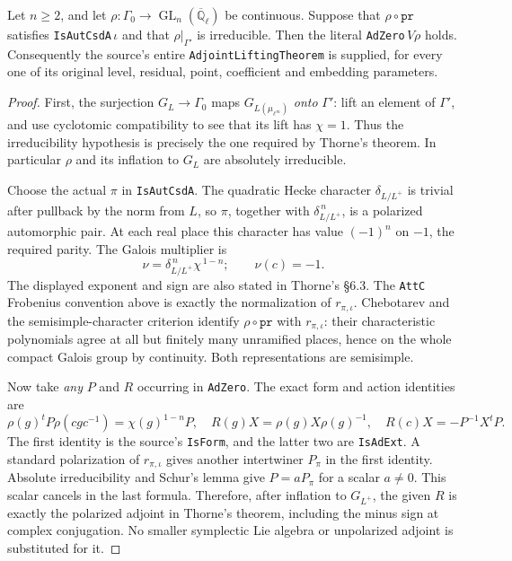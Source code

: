 \begin{proposition}
\label{claim:QX1}
Let $n\ge2$, and let $\rho:\Gamma_0\to
\operatorname{GL}_n(\overline{\mathbb Q}_\ell)$ be continuous.
Suppose that $\rho\circ\texttt{pr}$ satisfies
\texttt{IsAutCsdA}$\,\iota$ and that $\rho|_{\Gamma'}$ is
irreducible.  Then the literal \texttt{AdZero}$\,V\rho$ holds.
Consequently the source's entire \texttt{AdjointLiftingTheorem}
is supplied, for every one of its original level, residual, point,
coefficient and embedding parameters.
\end{proposition}
\begin{proof}
First, the surjection $G_L\to\Gamma_0$ maps
$G_{L(\mu_{\ell^\infty})}$ \emph{onto} $\Gamma'$: lift an element
of $\Gamma'$, and use cyclotomic compatibility to see that its lift
has $\chi=1$.  Thus the irreducibility hypothesis is precisely the
one required by Thorne's theorem.  In particular $\rho$ and its
inflation to $G_L$ are absolutely irreducible.

Choose the actual $\pi$ in \texttt{IsAutCsdA}.  The quadratic
Hecke character $\delta_{L/L^+}$ is trivial after pullback by the
norm from $L$, so $\pi$, together with
$\delta_{L/L^+}^{\,n}$, is a polarized automorphic pair.  At each
real place this character has value $(-1)^n$ on $-1$, the required
parity.  The Galois multiplier is
\[
       \nu=\delta_{L/L^+}^{\,n}\chi^{\,1-n};
       \qquad \nu(c)=-1.
       \tag{QX.2}
\]
The displayed exponent and sign are also stated in Thorne's
\S6.3.  The \texttt{AttC} Frobenius convention above is exactly
the normalization of $r_{\pi,\iota}$.  Chebotarev and the
semisimple-character criterion identify $\rho\circ\texttt{pr}$
with $r_{\pi,\iota}$: their characteristic polynomials agree at
all but finitely many unramified places, hence on the whole compact
Galois group by continuity.  Both representations are semisimple.

Now take \emph{any} $P$ and $R$ occurring in \texttt{AdZero}.
The exact form and action identities are
\[
 \rho(g)^tP\rho(cgc^{-1})=\chi(g)^{1-n}P,
 \quad R(g)X=\rho(g)X\rho(g)^{-1},
 \quad R(c)X=-P^{-1}X^tP.
 \tag{QX.3}
\]
The first identity is the source's \texttt{IsForm}, and the latter
two are \texttt{IsAdExt}.  A standard polarization of
$r_{\pi,\iota}$ gives another intertwiner $P_\pi$ in the first
identity.  Absolute irreducibility and Schur's lemma give
$P=aP_\pi$ for a scalar $a\ne0$.  This scalar cancels in the last
formula.  Therefore, after inflation to $G_{L^+}$, the given $R$
is exactly the polarized adjoint in Thorne's theorem, including
the minus sign at complex conjugation.  No smaller symplectic Lie
algebra or unpolarized adjoint is substituted for it.


\end{proof}
